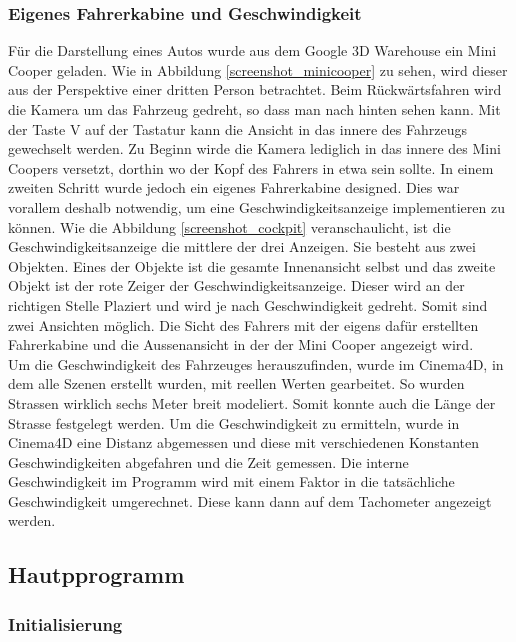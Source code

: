 \subsubsection{Eigenes Fahrerkabine und Geschwindigkeit}
Für die Darstellung eines Autos wurde aus dem Google 3D Warehouse ein Mini Cooper geladen. Wie in Abbildung \ref{screenshot_minicooper} zu sehen, wird dieser aus der Perspektive einer dritten Person betrachtet. Beim Rückwärtsfahren wird die Kamera um das Fahrzeug gedreht, so dass man nach hinten sehen kann. Mit der Taste V auf der Tastatur kann die Ansicht in das innere des Fahrzeugs gewechselt werden. Zu Beginn wirde die Kamera lediglich in das innere des Mini Coopers versetzt, dorthin wo der Kopf des Fahrers in etwa sein sollte. In einem zweiten Schritt wurde jedoch ein eigenes Fahrerkabine designed. Dies war vorallem deshalb notwendig, um eine Geschwindigkeitsanzeige implementieren zu können. Wie die Abbildung \ref{screenshot_cockpit} veranschaulicht, ist die Geschwindigkeitsanzeige die mittlere der drei Anzeigen. Sie besteht aus zwei Objekten. Eines der Objekte ist die gesamte Innenansicht selbst und das zweite Objekt ist der rote Zeiger der Geschwindigkeitsanzeige. Dieser wird an der richtigen Stelle Plaziert und wird je nach Geschwindigkeit gedreht. Somit sind zwei Ansichten möglich. Die Sicht des Fahrers mit der eigens dafür erstellten Fahrerkabine und die Aussenansicht in der der Mini Cooper angezeigt wird.\\
Um die Geschwindigkeit des Fahrzeuges herauszufinden, wurde im Cinema4D, in dem alle Szenen erstellt wurden, mit reellen Werten gearbeitet. So wurden Strassen wirklich sechs Meter breit modeliert. Somit konnte auch die Länge der Strasse festgelegt werden. Um die Geschwindigkeit zu ermitteln, wurde in Cinema4D eine Distanz abgemessen und diese mit verschiedenen Konstanten Geschwindigkeiten abgefahren und die Zeit gemessen. Die interne Geschwindigkeit im Programm wird mit einem Faktor in die tatsächliche Geschwindigkeit umgerechnet. Diese kann dann auf dem Tachometer angezeigt werden.\\

\newpage
\subsection{Hautpprogramm}


\subsubsection{Initialisierung}

